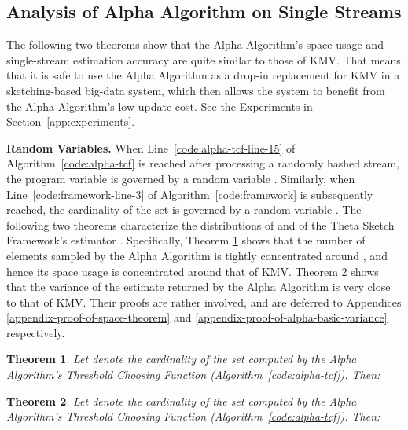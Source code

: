 \documentclass{article}
\newtheorem{theorem}{Theorem}[section]
\begin{document}
\subsection{Analysis of Alpha Algorithm on Single Streams}\label{sec:alpha-space}
The following two theorems show that the Alpha Algorithm's space usage
and single-stream estimation accuracy are quite similar to those of KMV.
That means that it is safe to use the Alpha Algorithm as a drop-in replacement
for KMV in a sketching-based big-data system, which then allows the system to benefit 
from the Alpha Algorithm's low update cost. See the Experiments in Section~\ref{app:experiments}.

\noindent \textbf{Random Variables.} When Line~\ref{code:alpha-tcf-line-15} of
Algorithm~\ref{code:alpha-tcf} is reached after processing a randomly hashed
stream, the program variable  is governed by a random variable .
Similarly, when Line~\ref{code:framework-line-3} of Algorithm~\ref{code:framework}
is subsequently reached, the cardinality of the set  is governed by a random 
variable . The following two theorems characterize the distributions
of  and of the Theta Sketch Framework's estimator .
Specifically, Theorem \ref{space-theorem} shows that the number of elements sampled by the Alpha Algorithm is tightly concentrated around ,
and hence its space usage is concentrated around that of KMV.
Theorem \ref{thm:alpha-basic-variance} shows that the variance of the estimate returned by the Alpha Algorithm
is very close to that of KMV.
Their proofs are rather involved, and are deferred to Appendices \ref{appendix-proof-of-space-theorem} and
\ref{appendix-proof-of-alpha-basic-variance} respectively.

\begin{theorem}\label{space-theorem}
Let  denote the cardinality of the set  computed by the Alpha Algorithm's Threshold Choosing Function (Algorithm~\ref{code:alpha-tcf}). Then:

\end{theorem}



\begin{theorem}\label{thm:alpha-basic-variance}
Let  denote the cardinality of the set  computed by the Alpha Algorithm's Threshold Choosing Function (Algorithm~\ref{code:alpha-tcf}). Then:

\end{theorem}
\end{document}
